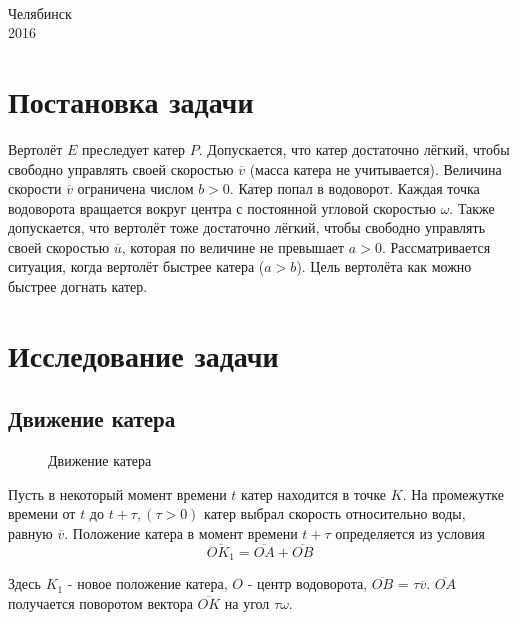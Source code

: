 \documentclass[12pt,a4paper,titlepage]{article}
\begin{document}
\begin{titlepage}
\begin{center}
{\begin{tabular}[t]{lllllllllllllllllll}
\end{tabular}
\\[1.5cm]}

\small{Челябинск}\\
\small{2016}
\end{center}
\end{titlepage}
\tableofcontents
\section{Постановка задачи}
\par
Вертолёт \(E\) преследует катер $P$.
Допускается, что катер достаточно лёгкий, чтобы свободно управлять своей скоростью $\overline{v}$ (масса катера не учитывается).
Величина скорости $\overline{v}$ ограничена числом $b > 0$.
Катер попал в водоворот.
Каждая точка водоворота вращается вокруг центра с постоянной угловой скоростью $\omega$.
Также допускается, что вертолёт тоже достаточно лёгкий, чтобы свободно управлять своей скоростью $\overline{u}$,
которая по величине не превышает $a > 0$.
Рассматривается ситуация, когда вертолёт быстрее катера ($a > b$).
Цель вертолёта как можно быстрее догнать катер.

\section{Исследование задачи}
  \subsection{Движение катера}
    \begin{figure}
      \centering
      \def\svgwidth{\columnwidth}
      
      \caption{Движение катера}
    \end{figure}

    Пусть в некоторый момент времени $t$ катер находится в точке $K$.
    На промежутке времени от $t$ до $t + \tau, (\tau > 0)$ катер выбрал скорость относительно воды,
    равную $\overline{v}$.
    Положение катера в момент времени $t + \tau$ определяется из условия
    \begin{equation}\label{movement:equation}
      \overline{OK_1} = \overline{OA} + \overline{OB} 
    \end{equation}
    
    Здесь $K_1$ - новое положение катера,
    $O$ - центр водоворота,
    $\overline{OB}$ = $\tau\overline{v}$.
    $\overline{OA}$ получается поворотом вектора $\overline{OK}$ на угол $\tau\omega$.
\end{document}
